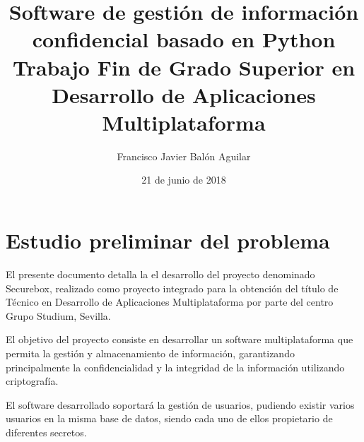 \documentclass[a4paper, 11pt, titlepage]{article}
\title{\textbf{Software de gestión de información confidencial basado en Python}\\ 
Trabajo Fin de Grado Superior en Desarrollo de Aplicaciones Multiplataforma}
\author{Francisco Javier Balón Aguilar}
\date{21 de junio de 2018}
\begin{document}
\maketitle
\renewcommand{\contentsname}{Índice}
\tableofcontents
\newpage

\section{Estudio preliminar del problema}

    El presente documento detalla la el desarrollo del proyecto denominado Securebox, 
    realizado como proyecto integrado para la obtención del título de Técnico en 
    Desarrollo de Aplicaciones Multiplataforma por parte del centro Grupo Studium, 
    Sevilla. 

    El objetivo del proyecto consiste en desarrollar un software multiplataforma que 
    permita la gestión y almacenamiento de información, garantizando principalmente 
    la confidencialidad y la integridad de la información utilizando criptografía. 

    El software desarrollado soportará la gestión de usuarios, pudiendo existir 
    varios usuarios en la misma base de datos, siendo cada uno de ellos propietario 
    de diferentes secretos. 
\end{document}
